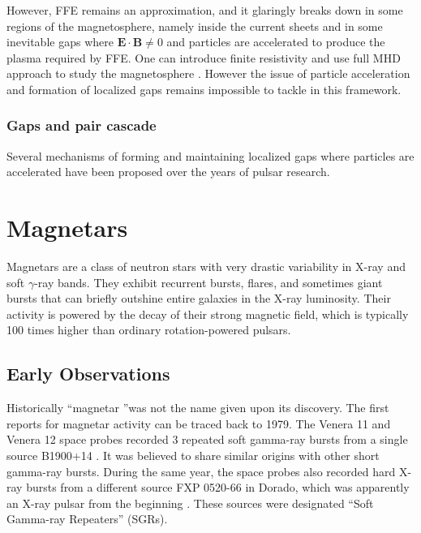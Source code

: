 
However, FFE remains an approximation, and it glaringly breaks down in some
regions of the magnetosphere, namely inside the current sheets and in some
inevitable gaps where $\mathbf{E}\cdot \mathbf{B} \neq 0$ and particles are
accelerated to produce the plasma required by FFE. One can introduce finite
resistivity and use full MHD approach to study the magnetosphere %
. However the issue of particle acceleration and formation of localized gaps
remains impossible to tackle in this framework.

\subsubsection{Gaps and pair cascade}
\label{sec:gap-models}

Several mechanisms of forming and maintaining localized gaps where particles are
accelerated have been proposed over the years of pulsar research.


\section{Magnetars}
\label{sec:intro-magnetars}

Magnetars are a class of neutron stars with very drastic variability in X-ray
and soft $\gamma$-ray bands. They exhibit recurrent bursts, flares, and
sometimes giant bursts that can briefly outshine entire galaxies in the X-ray
luminosity. Their activity is powered by the decay of their strong magnetic
field, which is typically 100 times higher than ordinary rotation-powered
pulsars.

\subsection{Early Observations}
\label{sec:intro-magnetar-observation}

Historically ``magnetar ''was not the name given upon its discovery. The first
reports for magnetar activity can be traced back to 1979. The Venera 11 and
Venera 12 space probes recorded 3 repeated soft gamma-ray bursts from a single
source B1900+14 \citep{mazets_soft_1979}. It was believed to share similar
origins with other short gamma-ray bursts. During the same year, the space
probes also recorded hard X-ray bursts from a different source FXP 0520-66 in
Dorado, which was apparently an X-ray pulsar from the beginning
\citep{mazets_observations_1979}. These sources were designated ``Soft Gamma-ray
Repeaters'' (SGRs).


